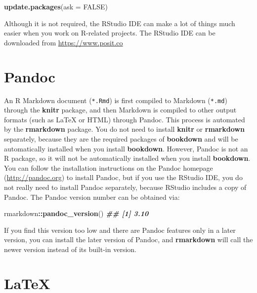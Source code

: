 \documentclass[
  12pt,
]{krantz}
\newenvironment{Shaded}{\begin{snugshade}}{\end{snugshade}}
\newcommand{\AttributeTok}[1]{\textcolor[rgb]{0.13,0.29,0.53}{#1}}
\newcommand{\ConstantTok}[1]{\textcolor[rgb]{0.56,0.35,0.01}{#1}}
\newcommand{\DocumentationTok}[1]{\textcolor[rgb]{0.56,0.35,0.01}{\textbf{\textit{#1}}}}
\newcommand{\FunctionTok}[1]{\textcolor[rgb]{0.13,0.29,0.53}{\textbf{#1}}}
\newcommand{\NormalTok}[1]{#1}
\newcommand{\SpecialCharTok}[1]{\textcolor[rgb]{0.81,0.36,0.00}{\textbf{#1}}}
\theoremstyle{definition}
\theoremstyle{definition}
\theoremstyle{definition}
\theoremstyle{definition}
\theoremstyle{remark}
\begin{document}
\begin{Shaded}
\begin{Highlighting}[]
\FunctionTok{update.packages}\NormalTok{(}\AttributeTok{ask =} \ConstantTok{FALSE}\NormalTok{)}
\end{Highlighting}
\end{Shaded}

Although it is not required, the RStudio IDE can make a lot of things much easier when you work on R-related projects. The RStudio IDE can be downloaded from \url{https://www.posit.co}

\section{Pandoc}\label{pandoc}

An R Markdown document (\texttt{*.Rmd}) is first compiled to Markdown (\texttt{*.md}) through the \textbf{knitr} package, and then Markdown is compiled to other output formats (such as LaTeX or HTML) through Pandoc. This process is automated by the \textbf{rmarkdown} package. You do not need to install \textbf{knitr} or \textbf{rmarkdown} separately, because they are the required packages of \textbf{bookdown} and will be automatically installed when you install \textbf{bookdown}. However, Pandoc is not an R package, so it will not be automatically installed when you install \textbf{bookdown}. You can follow the installation instructions on the Pandoc homepage (\url{http://pandoc.org}) to install Pandoc, but if you use the RStudio IDE, you do not really need to install Pandoc separately, because RStudio includes a copy of Pandoc. The Pandoc version number can be obtained via:

\begin{Shaded}
\begin{Highlighting}[]
\NormalTok{rmarkdown}\SpecialCharTok{::}\FunctionTok{pandoc\_version}\NormalTok{()}
\DocumentationTok{\#\# [1] \textquotesingle{}3.10\textquotesingle{}}
\end{Highlighting}
\end{Shaded}

If you find this version too low and there are Pandoc features only in a later version, you can install the later version of Pandoc, and \textbf{rmarkdown} will call the newer version instead of its built-in version.

\section{LaTeX}\label{latex}
\end{document}
